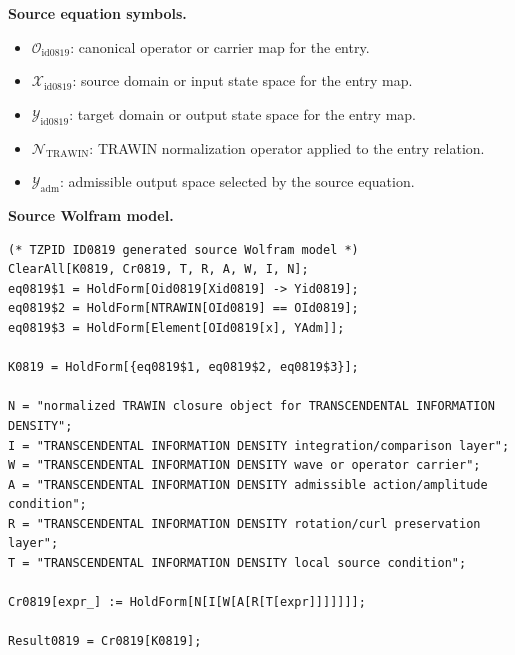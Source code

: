 \begin{minipage}[t]{0.49\linewidth}
\begingroup
\small
\raggedright
\textbf{Source equation symbols.}\par
\begin{itemize}[leftmargin=1.35em,itemsep=1pt,topsep=1pt,parsep=0pt]
    \item $\mathcal{O}_{\mathrm{id0819}}$: canonical operator or carrier map for the entry.
    \item $\mathcal{X}_{\mathrm{id0819}}$: source domain or input state space for the entry map.
    \item $\mathcal{Y}_{\mathrm{id0819}}$: target domain or output state space for the entry map.
    \item $\mathcal{N}_{\mathrm{TRAWIN}}$: TRAWIN normalization operator applied to the entry relation.
    \item $\mathcal{Y}_{\mathrm{adm}}$: admissible output space selected by the source equation.
\end{itemize}
\endgroup
\end{minipage}\hfill
\begin{minipage}[t]{0.47\linewidth}
\begingroup
\scriptsize
\raggedright
\textbf{Source Wolfram model.}\par
\begin{Verbatim}[fontsize=\tiny,breaklines=true,breakanywhere=true]
(* TZPID ID0819 generated source Wolfram model *)
ClearAll[K0819, Cr0819, T, R, A, W, I, N];
eq0819$1 = HoldForm[Oid0819[Xid0819] -> Yid0819];
eq0819$2 = HoldForm[NTRAWIN[OId0819] == OId0819];
eq0819$3 = HoldForm[Element[OId0819[x], YAdm]];

K0819 = HoldForm[{eq0819$1, eq0819$2, eq0819$3}];

N = "normalized TRAWIN closure object for TRANSCENDENTAL INFORMATION DENSITY";
I = "TRANSCENDENTAL INFORMATION DENSITY integration/comparison layer";
W = "TRANSCENDENTAL INFORMATION DENSITY wave or operator carrier";
A = "TRANSCENDENTAL INFORMATION DENSITY admissible action/amplitude condition";
R = "TRANSCENDENTAL INFORMATION DENSITY rotation/curl preservation layer";
T = "TRANSCENDENTAL INFORMATION DENSITY local source condition";

Cr0819[expr_] := HoldForm[N[I[W[A[R[T[expr]]]]]]];

Result0819 = Cr0819[K0819];
\end{Verbatim}
\endgroup
\end{minipage}

